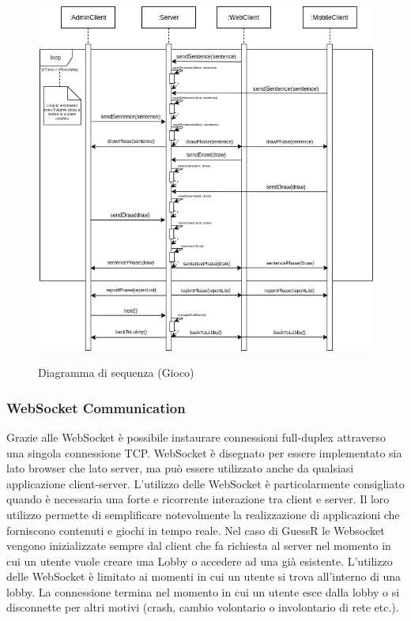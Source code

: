 \begin{figure}[H]
    \caption{Diagramma di sequenza (Gioco)}
    \centering
    \includegraphics[width=150mm]{img/ingSoft/Sequence Game.png}
    \label{fig:sequence_game}
\end{figure}

\subsubsection{WebSocket Communication}
Grazie alle WebSocket è possibile instaurare connessioni full-duplex attraverso una singola connessione TCP.\newline
WebSocket è disegnato per essere implementato sia lato browser che lato server, ma può essere utilizzato anche da qualsiasi applicazione client-server.\newline
L'utilizzo delle WebSocket è particolarmente consigliato quando è necessaria una forte e ricorrente interazione tra client e server. Il loro utilizzo permette di semplificare notevolmente la realizzazione di applicazioni che forniscono contenuti e giochi in tempo reale.\newline
Nel caso di GuessR le Websocket vengono inizializzate sempre dal client che fa richiesta al server nel momento in cui un utente vuole creare una Lobby o accedere ad una già esistente.
L'utilizzo delle WebSocket è limitato ai momenti in cui un utente si trova all'interno di una lobby. La connessione termina nel momento in cui un utente esce dalla lobby o si disconnette per altri motivi (crash, cambio volontario o involontario di rete etc.).

